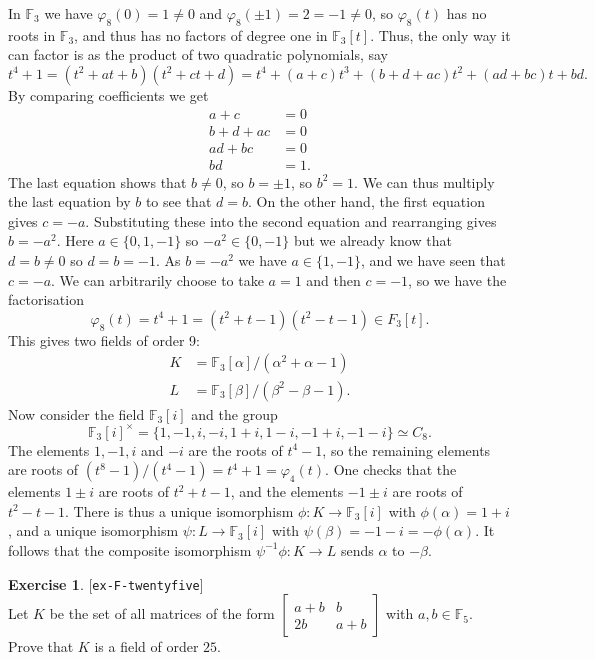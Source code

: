 \documentclass{amsart}
\newcommand{\F}         {{\mathbb{F}}}
\newcommand{\al}        {\alpha}
\newcommand{\bt}        {\beta}
\newcommand{\vph}       {\varphi}
\newcommand{\bsm}       {\left[\begin{smallmatrix}}
\newcommand{\esm}       {\end{smallmatrix}\right]}
\newcommand{\tm}        {\times}
\renewcommand{\:}{\colon}
\newcommand{\lastexlabel}{}
\newcommand{\exlabel}[1]{
 \global\def\lastexlabel{#1}\label{#1}[\texttt{#1}]\ \\
}
\newcommand{\exlabel}[1]{
 \global\def\lastexlabel{#1}\label{#1}
}
\newenvironment{solution}{\SolutionInline}{\endSolutionInline}
\theoremstyle{definition}
\newtheorem{exercise}{Exercise}[section]
\renewenvironment{solution}{\SolutionAtEnd}{\endSolutionAtEnd}
\begin{document}
\begin{solution}
 In $\F_3$ we have $\vph_8(0)=1\neq 0$ and $\vph_8(\pm 1)=2=-1\neq 0$,
 so $\vph_8(t)$ has no roots in $\F_3$, and thus has no factors of
 degree one in $\F_3[t]$.  Thus, the only way it can factor is as the
 product of two quadratic polynomials, say
 \[ t^4+1 = (t^2+at+b)(t^2+ct+d) = 
     t^4+(a+c)t^3+(b+d+ac)t^2+(ad+bc)t+bd.
 \]
 By comparing coefficients we get 
 \begin{align*}
  a+c &= 0 \\
  b+d+ac &= 0 \\
  ad+bc &= 0 \\
  bd &= 1.
 \end{align*}
 The last equation shows that $b\neq 0$, so $b=\pm 1$, so $b^2=1$.  We
 can thus multiply the last equation by $b$ to see that $d=b$.  On the
 other hand, the first equation gives $c=-a$.  Substituting these into
 the second equation and rearranging gives $b=-a^2$.  Here
 $a\in\{0,1,-1\}$ so $-a^2\in\{0,-1\}$ but we already know that
 $d=b\neq 0$ so $d=b=-1$.  As $b=-a^2$ we have $a\in\{1,-1\}$, and we
 have seen that $c=-a$.  We can arbitrarily choose to take $a=1$ and
 then $c=-1$, so we have the factorisation
 \[ \vph_8(t)=t^4+1=(t^2+t-1)(t^2-t-1) \in F_3[t]. \]
 This gives two fields of order 9:
 \begin{align*}
  K &= \F_3[\al]/(\al^2+\al-1) \\
  L &= \F_3[\bt]/(\bt^2-\bt-1).
 \end{align*}
 Now consider the field $\F_3[i]$ and the group 
 \[ \F_3[i]^\tm = \{ 1,-1,i,-i,1+i,1-i,-1+i,-1-i\} \simeq C_8. \]
 The elements $1,-1,i$ and $-i$ are the roots of $t^4-1$, so the
 remaining elements are roots of $(t^8-1)/(t^4-1)=t^4+1=\vph_4(t)$.
 One checks that the elements $1\pm i$ are roots of $t^2+t-1$, and the
 elements $-1\pm i$ are roots of $t^2-t-1$.  There is thus a unique
 isomorphism $\phi\:K\to\F_3[i]$ with $\phi(\al)=1+i$, and a unique
 isomorphism $\psi\:L\to\F_3[i]$ with $\psi(\bt)=-1-i=-\phi(\al)$.  It
 follows that the composite isomorphism $\psi^{-1}\phi\:K\to L$ sends
 $\al$ to $-\bt$.  
\end{solution}
\begin{exercise}\exlabel{ex-F-twentyfive}
 Let $K$ be the set of all matrices of the form
 $\bsm a+b&b\\ 2b&a+b\esm$ with $a,b\in\F_5$.  Prove that $K$ is a
 field of order $25$.
\end{exercise}
\end{document}
